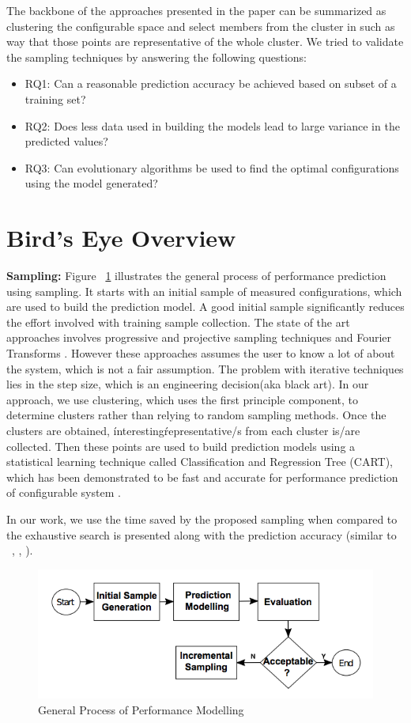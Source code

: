 \documentclass{sig-alternative}
\newcommand{\bi}{\begin{itemize}}%
\newcommand{\ei}{\end{itemize}}
\begin{document}
The backbone of the approaches presented in the paper can be summarized as clustering the configurable space and select members from the cluster in such as way that those points are representative of the whole cluster. We tried to validate the sampling techniques by answering the following questions:
        \bi
            \item{RQ1: Can a reasonable prediction accuracy be achieved based on subset of a training set?}
            \item{RQ2: Does less data used in building the models lead to large variance in the predicted values?}
            \item{RQ3: Can evolutionary algorithms be used to find the optimal configurations using the model generated?}
        \ei
 
\section{Bird's Eye Overview}


    \textbf{Sampling: } Figure ~\ref{fig:GeneralProcess} illustrates the general process of performance prediction using sampling. It starts with an initial sample of measured configurations, which are used to build the prediction model. A good initial sample significantly reduces the effort involved with training sample collection. The state of the art approaches involves progressive and projective sampling techniques \cite{sarkar2015cost} and Fourier Transforms \cite{zhang2015performance}. However these approaches assumes the user to know a lot of about the system, which is not a fair assumption. The problem with iterative techniques lies in the step size, which is an engineering decision(aka black art). In our approach, we use clustering, which uses the first principle component, to determine clusters rather than relying to random sampling methods. Once the clusters are obtained, \'interesting\' representative/s from each cluster  is/are collected. Then these points are used to build prediction models using a statistical learning technique called Classification and Regression Tree (CART), which has been demonstrated to be fast and accurate for performance prediction of configurable system \cite{guo2013variability}.
    
In our work, we use the time saved by the proposed sampling when compared to the exhaustive search is presented along with the prediction accuracy (similar to ~\cite{guo2013variability}, \cite{siegmund2012predicting}, \cite{westermann2012automated}). 
    \begin{figure}[!t]
\includegraphics[width=0.9\linewidth]{Figures/GeneralProcess.png}
\caption{ General Process of Performance Modelling }\label{fig:GeneralProcess}
\end{figure}
\end{document}
